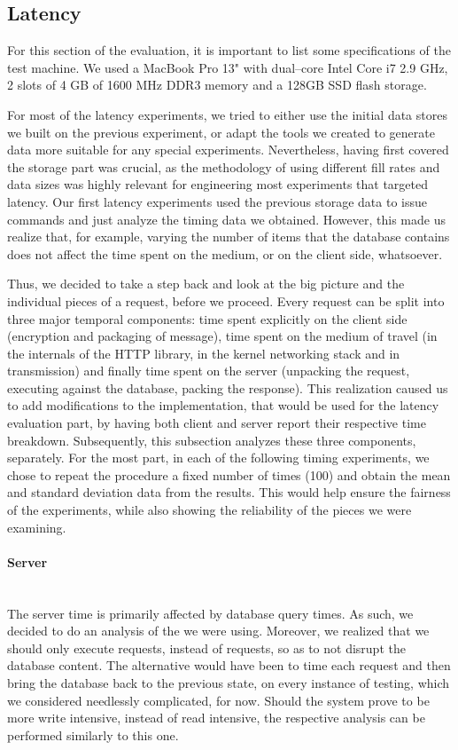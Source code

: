 \subsection{Latency}
For this section of the evaluation, it is important to list some specifications of the test machine.
We used a MacBook Pro 13" with dual--core Intel Core i7 2.9 GHz, 2 slots of 4 GB of 1600 MHz DDR3 memory and a 128GB SSD flash storage.

For most of the latency experiments, we tried to either use the initial data stores we built on the previous experiment, or adapt the tools we created to generate data more suitable for any special experiments.
Nevertheless, having first covered the storage part was crucial, as the methodology of using different fill rates and data sizes was highly relevant for engineering most experiments that targeted latency.
Our first latency experiments used the previous storage data to issue  commands and just analyze the timing data we obtained.
However, this made us realize that, for example, varying the number of items that the database contains does not affect the time spent on the medium, or on the client side, whatsoever.

Thus, we decided to take a step back and look at the big picture and the individual pieces of a request, before we proceed.
Every request can be split into three major temporal components: time spent explicitly on the client side (encryption and packaging of message), time spent on the medium of travel (in the internals of the HTTP library, in the kernel networking stack and in transmission) and finally time spent on the server (unpacking the request, executing against the database, packing the response).
This realization caused us to add modifications to the implementation, that would be used for the latency evaluation part, by having both client and server report their respective time breakdown.
Subsequently, this subsection analyzes these three components, separately.
For the most part, in each of the following timing experiments, we chose to repeat the procedure a fixed number of times (100) and obtain the mean and standard deviation data from the results.
This would help ensure the fairness of the experiments, while also showing the reliability of the pieces we were examining.

\paragraph{Server} ~\\
The server time is primarily affected by database query times.
As such, we decided to do an analysis of the  we were using.
Moreover, we realized that we should only execute  requests, instead of  requests, so as to not disrupt the database content.
The alternative would have been to time each  request and then bring the database back to the previous state, on every instance of testing, which we considered needlessly complicated, for now.
Should the system prove to be more write intensive, instead of read intensive, the respective analysis can be performed similarly to this one.

